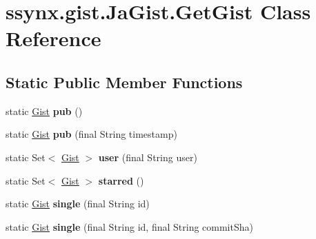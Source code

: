 \hypertarget{classssynx_1_1gist_1_1JaGist_1_1GetGist}{}\section{ssynx.\+gist.\+Ja\+Gist.\+Get\+Gist Class Reference}
\label{classssynx_1_1gist_1_1JaGist_1_1GetGist}
\subsection*{Static Public Member Functions}
\begin{DoxyCompactItemize}
\item 
\mbox{\label{classssynx_1_1gist_1_1JaGist_1_1GetGist_af97831dad1e7903dbc7b83e51380e7f6}} 
static \hyperlink{classssynx_1_1gist_1_1Gist}{Gist} {\bfseries pub} ()
\item 
\mbox{\label{classssynx_1_1gist_1_1JaGist_1_1GetGist_a5d9168a11518e2f2f5c462a67e39803c}} 
static \hyperlink{classssynx_1_1gist_1_1Gist}{Gist} {\bfseries pub} (final String timestamp)
\item 
\mbox{\label{classssynx_1_1gist_1_1JaGist_1_1GetGist_acaeb8e9082c3d31fc0f0b5d0254e3d62}} 
static Set$<$ \hyperlink{classssynx_1_1gist_1_1Gist}{Gist} $>$ {\bfseries user} (final String user)
\item 
\mbox{\label{classssynx_1_1gist_1_1JaGist_1_1GetGist_a5a10696e02eb9ad023cd4a0af834afde}} 
static Set$<$ \hyperlink{classssynx_1_1gist_1_1Gist}{Gist} $>$ {\bfseries starred} ()
\item 
\mbox{\label{classssynx_1_1gist_1_1JaGist_1_1GetGist_ab877eac5cf91755cc294132041703dbb}} 
static \hyperlink{classssynx_1_1gist_1_1Gist}{Gist} {\bfseries single} (final String id)
\item 
\mbox{\label{classssynx_1_1gist_1_1JaGist_1_1GetGist_a505929f531ae8ec01ac189f17191ccd5}} 
static \hyperlink{classssynx_1_1gist_1_1Gist}{Gist} {\bfseries single} (final String id, final String commit\+Sha)
\item 

\end{DoxyCompactItemize}
